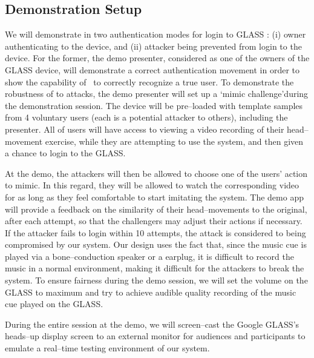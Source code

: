 \subsection{Demonstration Setup} 
We will demonstrate \systemname in two authentication modes for login to GLASS : (i) owner authenticating to the device, and (ii) attacker being prevented from login to the device.
For the former, the demo presenter, considered as one of the owners of the GLASS device, will demonstrate a correct authentication movement in order to show the capability of \systemname~to correctly recognize a true user. To demonstrate the robustness of \systemname to attacks, the demo presenter will set up a \lq mimic challenge\rq during the demonstration session.  
The device will be pre--loaded with template samples from 4 voluntary users (each is a potential attacker to others), including the presenter. All of users will have access to viewing a video recording of their head--movement exercise, while they are attempting to use the system, and then given a chance to login to the GLASS. 

At the demo, the attackers will then be allowed to choose one of the users' action to mimic. In this regard, they will be allowed to watch the corresponding video for as long as they feel comfortable to start imitating the system. The demo app will provide a feedback on the similarity of their head--movements to the original, after each attempt, so that the challengers may adjust their actions if necessary. If the attacker fails to login within 10 attempts, the attack is considered to being compromised by our system. Our design uses the fact that, since the music cue is played via a bone--conduction speaker or a earplug, it is difficult to record the music in a normal environment, making it difficult for the attackers to break the system. To ensure fairness during the demo session, we will set the volume on the GLASS to maximum and try to achieve audible quality recording of the music cue played on the GLASS.

During the entire session at the demo, we will screen--cast the Google GLASS's heads--up display screen to an external monitor for audiences and participants to emulate a real--time testing environment of our system.

